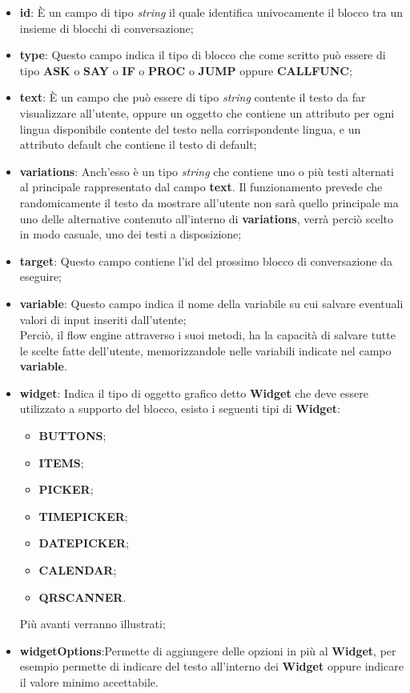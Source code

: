 \begin{itemize}
	\item \textbf{id}: È un campo di tipo \emph{string} il quale identifica univocamente il blocco tra un insieme di blocchi di conversazione;
	\item \textbf{type}: Questo campo indica il tipo di blocco che come scritto può essere di tipo \textbf{ASK} o \textbf{SAY} o \textbf{IF} o \textbf{PROC} o \textbf{JUMP} oppure \textbf{CALLFUNC};        
	\item \textbf{text}: È un campo che può essere di tipo \textsl{string} contente il testo da far visualizzare all'utente, oppure un oggetto che contiene un attributo per ogni lingua disponibile contente del testo nella corrispondente lingua, e un attributo default che contiene il testo di default;
	\item \textbf{variations}: Anch'esso è un tipo \emph{string} che contiene uno o più testi alternati al principale rappresentato dal campo \textbf{text}. Il funzionamento prevede che randomicamente il testo da mostrare all'utente non sarà quello principale ma uno delle alternative contenuto all'interno di \textbf{variations}, verrà perciò scelto in modo casuale, uno dei testi a disposizione; 
	\item \textbf{target}: Questo campo contiene l'id del prossimo blocco di conversazione da eseguire;
	\item \textbf{variable}: Questo campo indica il nome della variabile su cui salvare eventuali valori di input inseriti dall'utente; \\
	Perciò, il flow engine attraverso i suoi metodi, ha la capacità di salvare tutte le scelte fatte dell'utente, memorizzandole nelle variabili indicate nel campo \textbf{variable}.
	\item \textbf{widget}: Indica il tipo di oggetto grafico detto \textbf{Widget} che deve essere utilizzato a supporto del blocco, esisto i seguenti tipi di \textbf{Widget}:
	\begin{itemize}
		\item \textbf{BUTTONS};
		\item \textbf{ITEMS};
		\item \textbf{PICKER};
		\item \textbf{TIMEPICKER};
		\item \textbf{DATEPICKER};
		\item \textbf{CALENDAR};
		\item \textbf{QRSCANNER}.
	\end{itemize}
	Più avanti verranno illustrati;
	\item \textbf{widgetOptions}:Permette di aggiungere delle opzioni in più al \textbf{Widget}, per esempio permette di indicare del testo all'interno dei \textbf{Widget} oppure indicare il valore minimo accettabile.
\end{itemize} 



